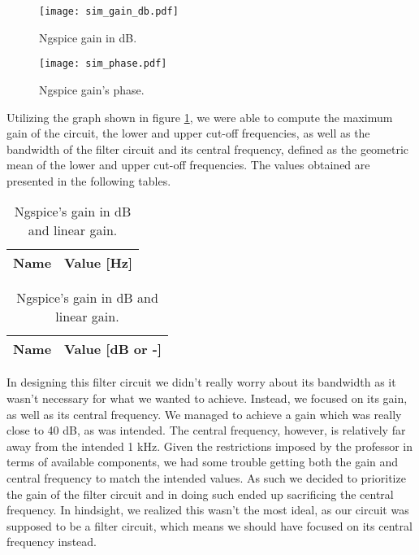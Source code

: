 \vspace{-0.25cm}
\begin{figure}[h] \centering
  \texttt{[image: sim\_gain\_db.pdf]}
  \caption{Ngspice gain in dB.}
  \label{fig:NgspiceGain_dB}
\end{figure}

\begin{figure}[h] \centering
  \texttt{[image: sim\_phase.pdf]}
  \caption{Ngspice gain's phase.}
  \label{fig:NgspicePhase}
\end{figure}

Utilizing the graph shown in figure \ref{fig:NgspiceGain_dB}, we were able to compute the maximum gain of the circuit, the lower
and upper cut-off frequencies, as well as the bandwidth of the filter circuit and its central frequency, defined as
the geometric mean of the lower and upper cut-off frequencies. The values obtained are presented in the following tables.

\begin{table}[h]
  \parbox{.45\linewidth}{
    \centering
    \begin{tabular}{|c|c|}
      \hline
      {\bf Name} & {\bf Value [Hz]} \\ \hline
      
    \end{tabular}
    \caption{Ngspice's cut-off frequencies, bandwidth and central frequency.}
  }
  \hfill
  \parbox{.45\linewidth}{
    \centering
    \begin{tabular}{|c|c|}
      \hline
      {\bf Name} & {\bf Value [dB or -]} \\ \hline
      
    \end{tabular}
    \caption{Ngspice's gain in dB and linear gain.}
  }
\end{table}

In designing this filter circuit we didn't really worry about its bandwidth as it wasn't necessary for what we wanted to achieve. Instead, we focused
on its gain, as well as its central frequency. We managed to achieve a gain which was really close to 40 dB, as was intended. The central frequency, however,
is relatively far away from the intended 1 kHz. Given the restrictions imposed by the professor in terms of available components, we had some 
trouble getting both the gain and central frequency to match the intended values. As such we decided to prioritize the gain of the filter
circuit and in doing such ended up sacrificing the central frequency. In hindsight, we realized this wasn't the most ideal, as our circuit was supposed
to be a filter circuit, which means we should have focused on its central frequency instead.

